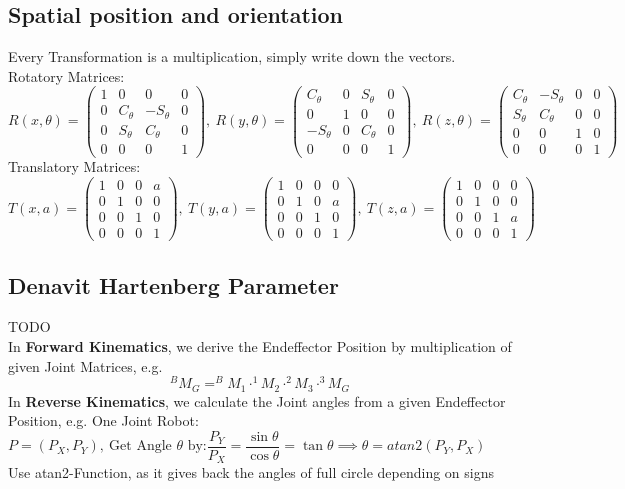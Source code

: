 \documentclass{exerciseBlue}
\begin{document}
\subsection{Spatial position and orientation}
Every Transformation is a multiplication, simply write down the vectors.\\
Rotatory Matrices:\\
$R(x,\theta) = \begin{pmatrix}
1&0&0&0\\
0&C_{\theta}&-S_{\theta}&0\\
0&S_{\theta}&C_{\theta}&0\\
0&0&0&1
\end{pmatrix}, \ 
R(y,\theta) = \begin{pmatrix}
C_{\theta}&0&S_{\theta}&0\\
0&1&0&0\\
-S_{\theta}&0&C_{\theta}&0\\
0&0&0&1
\end{pmatrix}, \ 
R(z,\theta) = \begin{pmatrix}
C_{\theta}&-S_{\theta}&0&0\\
S_{\theta}&C_{\theta}&0&0\\
0&0&1&0\\
0&0&0&1
\end{pmatrix}$\\
Translatory Matrices:\\
$T(x,a) = \begin{pmatrix}
1&0&0&a\\
0&1&0&0\\
0&0&1&0\\
0&0&0&1
\end{pmatrix}, \ 
T(y,a) = \begin{pmatrix}
1&0&0&0\\
0&1&0&a\\
0&0&1&0\\
0&0&0&1
\end{pmatrix}, \ 
T(z,a) = \begin{pmatrix}
1&0&0&0\\
0&1&0&0\\
0&0&1&a\\
0&0&0&1
\end{pmatrix}$
\subsection{Denavit Hartenberg Parameter}
TODO
\\
In \textbf{Forward Kinematics}, we derive the Endeffector Position by multiplication of given Joint Matrices, e.g.\\
$$^BM_G = ^BM_1 \cdot  ^1M_2 \cdot  ^2M_3 \cdot  ^3M_G$$
In \textbf{Reverse Kinematics}, we calculate the Joint angles from a given Endeffector Position, e.g. One Joint Robot:\\
$P = (P_X, P_Y), \ \text{Get Angle } \theta \text{ by:} \dfrac{P_Y}{P_X} = \dfrac{\sin \theta}{\cos \theta} = \tan \theta \implies \theta = atan2(P_Y, P_X)$\\
Use atan2-Function, as it gives back the angles of full circle depending on signs 
\end{document}
